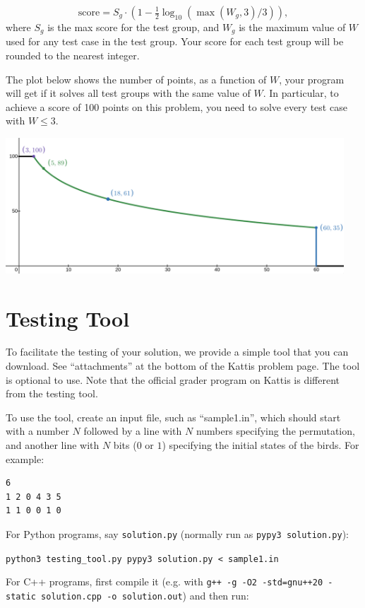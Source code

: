 \[\text{score} = S_g \cdot \left(1-\tfrac{1}{2}\log_{10}(\max(W_g,3)/3)\right),\]
where $S_g$ is the max score for the test group, and $W_g$ is the maximum value of $W$
used for any test case in the test group.
Your score for each test group will be rounded to the nearest integer.


The plot below shows the number of points, as a function of $W$, your program will get if it solves all test groups with the same value of $W$.
In particular, to achieve a score of 100 points on this problem, you need to solve every test case with $W\le 3$.

\begin{center}
\centering
\includegraphics[width=0.95\textwidth]{score_gardendecorations.png}
\end{center}

\section*{Testing Tool}
To facilitate the testing of your solution, we provide a simple tool that you can download.
See ``attachments'' at the bottom of the Kattis problem page.
The tool is optional to use. Note that the official grader program on Kattis is different from the testing tool.

To use the tool, create an input file, such as ``sample1.in'', which should start with a number $N$ followed by a line with $N$ numbers specifying the permutation, and another line with $N$ bits ($0$ or $1$) specifying the initial states of the birds. For example:

\begin{verbatim}
6
1 2 0 4 3 5
1 1 0 0 1 0
\end{verbatim}

For Python programs, say \texttt{solution.py} (normally run as \texttt{pypy3 solution.py}):

    \verb|python3 testing_tool.py pypy3 solution.py < sample1.in|


For C++ programs, first compile it
(e.g. with \texttt{g++ -g -O2 -std=gnu++20 -static solution.cpp -o solution.out})
and then run:

